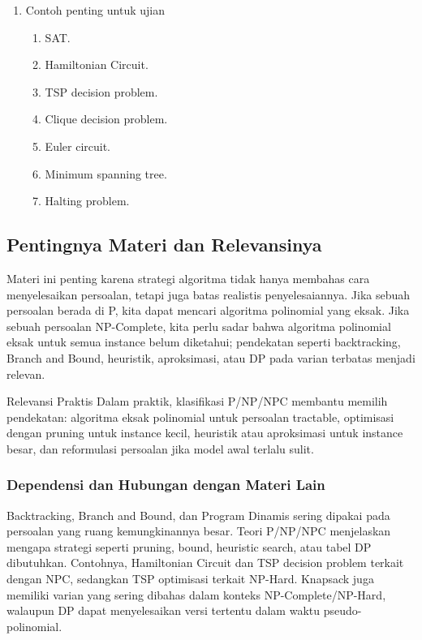 \begin{enumerate}
    \item Contoh penting untuk ujian
    \begin{enumerate}
        \item SAT.
        \item Hamiltonian Circuit.
        \item TSP decision problem.
        \item Clique decision problem.
        \item Euler circuit.
        \item Minimum spanning tree.
        \item Halting problem.
    \end{enumerate}
\end{enumerate}

\subsection{Pentingnya Materi dan Relevansinya}

Materi ini penting karena strategi algoritma tidak hanya membahas cara menyelesaikan persoalan, tetapi juga batas realistis penyelesaiannya. Jika sebuah persoalan berada di P, kita dapat mencari algoritma polinomial yang eksak. Jika sebuah persoalan NP-Complete, kita perlu sadar bahwa algoritma polinomial eksak untuk semua instance belum diketahui; pendekatan seperti backtracking, Branch and Bound, heuristik, aproksimasi, atau DP pada varian terbatas menjadi relevan.

\begin{cmt}{Relevansi Praktis}{}
Dalam praktik, klasifikasi P/NP/NPC membantu memilih pendekatan: algoritma eksak polinomial untuk persoalan tractable, optimisasi dengan pruning untuk instance kecil, heuristik atau aproksimasi untuk instance besar, dan reformulasi persoalan jika model awal terlalu sulit.
\end{cmt}

\subsubsection{Dependensi dan Hubungan dengan Materi Lain}

Backtracking, Branch and Bound, dan Program Dinamis sering dipakai pada persoalan yang ruang kemungkinannya besar. Teori P/NP/NPC menjelaskan mengapa strategi seperti pruning, bound, heuristic search, atau tabel DP dibutuhkan. Contohnya, Hamiltonian Circuit dan TSP decision problem terkait dengan NPC, sedangkan TSP optimisasi terkait NP-Hard. Knapsack juga memiliki varian yang sering dibahas dalam konteks NP-Complete/NP-Hard, walaupun DP dapat menyelesaikan versi tertentu dalam waktu pseudo-polinomial.

